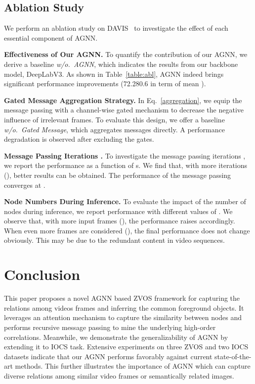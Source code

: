 \documentclass[10pt,twocolumn,letterpaper]{article}
\begin{document}
	\vspace*{-5pt}
\subsection{Ablation Study}\label{sec:ablation}
	\vspace*{-3pt}	
We perform an ablation
study on DAVIS~\cite{perazzi2016benchmark} to investigate the effect of each essential component of AGNN.

\noindent\textbf{Effectiveness of Our AGNN.} To quantify the contribution of our AGNN, we derive a baseline \textit{w/o.~AGNN}, which indicates the results from our backbone model, DeepLabV3. As shown in Table~\ref{table:abl}, AGNN indeed brings significant performance improvements (72.280.6 in term of mean ).

\noindent\textbf{Gated Message Aggregation Strategy.} In Eq.~\ref{aggregation}, we equip the message passing with a channel-wise gated mechanism to decrease the negative influence of irrelevant frames. To evaluate this design, we offer a baseline \textit{w/o.~Gated Message}, which aggregates messages directly. A performance degradation is observed after excluding the gates.

\noindent\textbf{Message Passing Iterations .} To investigate the message passing iterations  , we report the performance as a function of s. We find that, with more iterations (), better results can be obtained. The performance of the message passing converges at .

\noindent\textbf{Node Numbers  During Inference.}
To evaluate the impact of the number of nodes  during inference, we report performance with different values of .  We observe that, with more input frames (), the performance raises accordingly.  When even more frames are considered (), the final performance does not change obviously. This may be due to the redundant content in video sequences.







	\vspace*{-10pt}
\section{Conclusion}
	\vspace*{-4pt}	
This paper proposes a novel AGNN based ZVOS framework for capturing the relations among videos frames and inferring the common foreground objects. It leverages an attention mechanism to capture the similarity between nodes and performs recursive message passing to mine the underlying high-order correlations. Meanwhile, we demonstrate the generalizability of AGNN  by extending it to IOCS task. Extensive experiments on three ZVOS and two IOCS datasets indicate that our AGNN performs favorably against current state-of-the-art methods. This further illustrates the importance of  AGNN which can capture diverse relations among similar video frames or semantically related images. 
\end{document}

